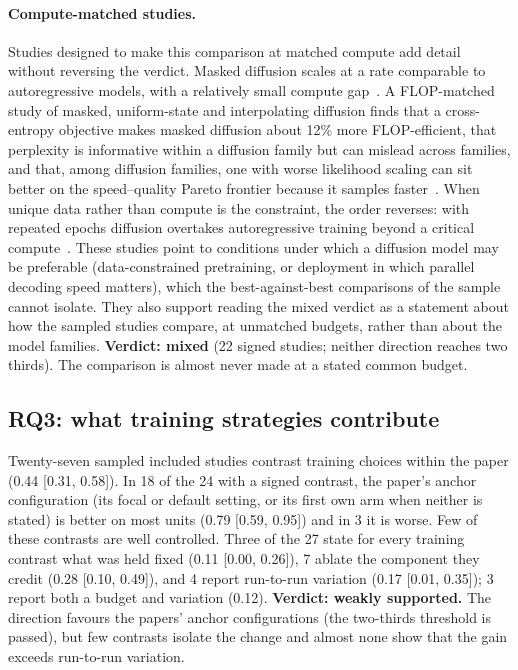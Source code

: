 \paragraph{Compute-matched studies.} Studies designed to make this comparison at matched compute add detail without reversing the verdict. Masked diffusion scales at a rate comparable to autoregressive models, with a relatively small compute gap~\cite{arXiv:2410.18514}. A FLOP-matched study of masked, uniform-state and interpolating diffusion finds that a cross-entropy objective makes masked diffusion about 12\% more FLOP-efficient, that perplexity is informative within a diffusion family but can mislead across families, and that, among diffusion families, one with worse likelihood scaling can sit better on the speed--quality Pareto frontier because it samples faster~\cite{arXiv:2602.15014}. When unique data rather than compute is the constraint, the order reverses: with repeated epochs diffusion overtakes autoregressive training beyond a critical compute~\cite{arXiv:2507.15857,arXiv:2511.03276}. These studies point to conditions under which a diffusion model may be preferable (data-constrained pretraining, or deployment in which parallel decoding speed matters), which the best-against-best comparisons of the sample cannot isolate. They also support reading the mixed verdict as a statement about how the sampled studies compare, at unmatched budgets, rather than about the model families.
\textbf{Verdict: mixed} (22 signed studies; neither direction reaches two thirds). The comparison is almost never made at a stated common budget.

\subsection{RQ3: what training strategies contribute}
\label{sec:rq3}
Twenty-seven sampled included studies contrast training choices within the paper (0.44 [0.31, 0.58]). In 18 of the 24 with a signed contrast, the paper's anchor configuration (its focal or default setting, or its first own arm when neither is stated) is better on most units (0.79 [0.59, 0.95]) and in 3 it is worse. %
Few of these contrasts are well controlled. Three of the 27 state for every training contrast what was held fixed (0.11 [0.00, 0.26]), 7 ablate the component they credit (0.28 [0.10, 0.49]), and 4 report run-to-run variation (0.17 [0.01, 0.35]); 3 report both a budget and variation (0.12). %
\textbf{Verdict: weakly supported.} The direction favours the papers' anchor configurations (the two-thirds threshold is passed), but few contrasts isolate the change and almost none show that the gain exceeds run-to-run variation.

